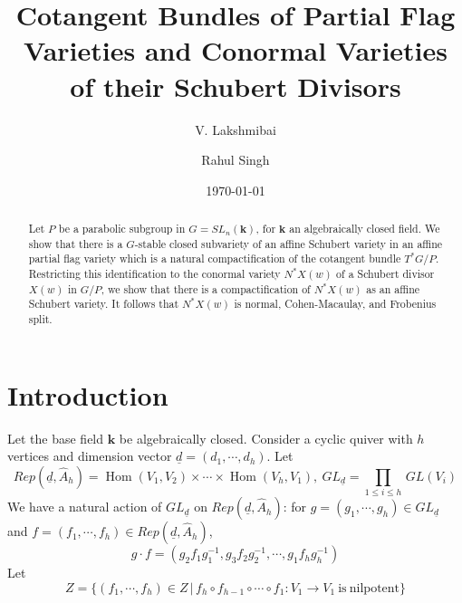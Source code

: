 \documentclass[paper=a4, fontsize=10pt]{amsart} %
\title{Cotangent Bundles of Partial Flag Varieties and Conormal Varieties of their Schubert Divisors}
\author{V. Lakshmibai}
\author{Rahul Singh}
\date{\normalsize\today} %
\theoremstyle{plain}
\theoremstyle{definition}
\theoremstyle{remark}
\numberwithin{equation}{section} %
\numberwithin{figure}{section} %
\numberwithin{table}{section} %
\numberwithin{subsection}{section} %
\begin{document}
\maketitle %

\begin{abstract}
Let $P$ be a parabolic subgroup in $G=SL_n(\mathbf k)$, for $\mathbf k$ an algebraically closed field.
We show that there is a $G$-stable closed subvariety of an affine Schubert variety in an affine partial flag variety which is a natural compactification of the cotangent bundle $T^*G/P$.
Restricting this identification to the conormal variety $N^*X(w)$ of a Schubert divisor $X(w)$ in $G/P$, we show that there is a compactification of $N^*X(w)$ as an affine Schubert variety.
It follows that $N^*X(w)$ is normal, Cohen-Macaulay, and Frobenius split.
\end{abstract}

\section{Introduction}
Let the base field $\mathbf k$ be algebraically closed. 
Consider a cyclic quiver with $h$ vertices and
dimension vector ${\underline d}=(d_1,\cdots, d_h)$.
Let
$$Rep(\underline d, \widehat A_h)=\operatorname{Hom}(V_1,V_{2})\times \cdots\times \operatorname{Hom}(V_h,V_{1}),\ 
GL_{{\underline d}}=\prod_{1\le i\le h}\,GL{(V_i)}$$ 
We have a natural action of $GL_{{\underline d}}$ on $Rep(\underline d,\widehat A_h)$: for
$g=(g_1,\cdots,g_h)\in GL_{{\underline d}}$ and $f=(f_1,\cdots,f_h)\in
Rep(\underline d,\widehat A_h)$,
$$g\cdot f=(g_2f_1g_1^{-1},g_3f_2g_2^{-1},\cdots,g_1f_hg_h^{-1})$$
Let $$Z=\{(f_1,\cdots,f_h)\in Z\,|\,f_h\circ
f_{h-1}\circ\cdots\circ f_1:V_1\rightarrow V_1{\mathrm{\ is\
nilpotent}}\}$$
\end{document}
